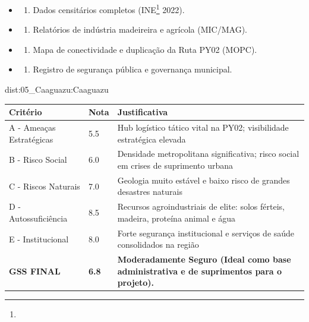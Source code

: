 {\begin{itemize}
\tightlist
\item
  \begin{enumerate}
  \def\labelenumi{\arabic{enumi})}
  \tightlist
  \item
    Dados censitários completos (INE\footnote{\fineINE} 2022).
  \end{enumerate}
\item
  \begin{enumerate}
  \def\labelenumi{\arabic{enumi})}
  \setcounter{enumi}{1}
  \tightlist
  \item
    Relatórios de indústria madeireira e agrícola (MIC/\allowbreak MAG).
  \end{enumerate}
\item
  \begin{enumerate}
  \def\labelenumi{\arabic{enumi})}
  \setcounter{enumi}{2}
  \tightlist
  \item
    Mapa de conectividade e duplicação da Ruta PY02 (MOPC).
  \end{enumerate}
\item
  \begin{enumerate}
  \def\labelenumi{\arabic{enumi})}
  \setcounter{enumi}{3}
  \tightlist
  \item
    Registro de segurança pública e governança municipal.
  \end{enumerate}
\end{itemize}}{dist:05_Caaguazu:Caaguazu}
\begin{table}[ht!]
\small \begin{tabular}{p{3.0cm}p{0.8cm}p{6.0cm}} \toprule
\textbf{Critério} & \textbf{Nota} & \textbf{Justificativa} \\ \midrule
A - Ameaças Estratégicas & 5.5 & Hub logístico tático vital na PY02; visibilidade estratégica elevada \\
B - Risco Social & 6.0 & Densidade metropolitana significativa; risco social em crises de suprimento urbana \\
C - Riscos Naturais & 7.0 & Geologia muito estável e baixo risco de grandes desastres naturais \\
D - Autossuficiência & 8.5 & Recursos agroindustriais de elite: solos férteis, madeira, proteína animal e água \\
E - Institucional & 8.0 & Forte segurança institucional e serviços de saúde consolidados na região \\
\midrule \textbf{GSS FINAL} & \textbf{6.8} & \textbf{Moderadamente Seguro (Ideal como base administrativa e de suprimentos para o projeto).} \\ \bottomrule \end{tabular}
\end{table}
